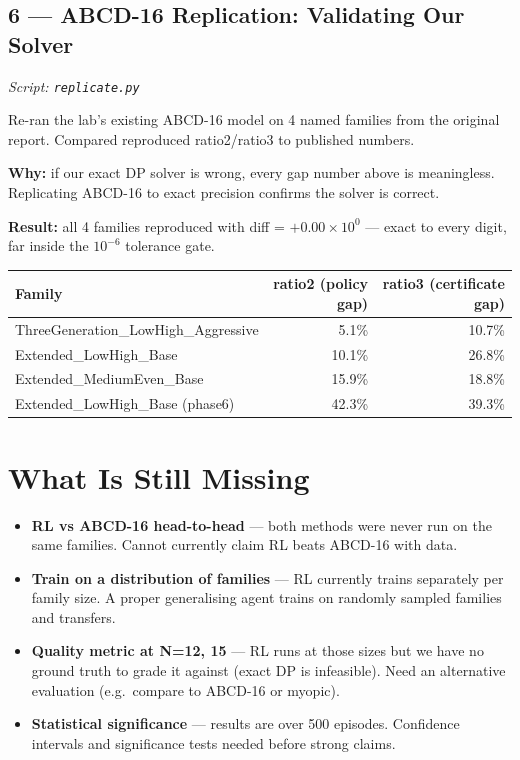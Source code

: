 \documentclass[11pt, a4paper]{article}
\begin{document}
\subsection{6 — ABCD-16 Replication: Validating Our Solver}
\textit{Script: \texttt{replicate.py}}

Re-ran the lab's existing ABCD-16 model on 4 named families from the original report.
Compared reproduced ratio2/ratio3 to published numbers.

\textbf{Why:} if our exact DP solver is wrong, every gap number above is meaningless.
Replicating ABCD-16 to exact precision confirms the solver is correct.

\textbf{Result:} all 4 families reproduced with diff = $+0.00 \times 10^{0}$ —
exact to every digit, far inside the $10^{-6}$ tolerance gate.

\begin{center}
\small
\begin{tabular}{lrr}
\toprule
\textbf{Family} & \textbf{ratio2 (policy gap)} & \textbf{ratio3 (certificate gap)} \\
\midrule
ThreeGeneration\_LowHigh\_Aggressive         & 5.1\%  & 10.7\% \\
Extended\_LowHigh\_Base                      & 10.1\% & 26.8\% \\
Extended\_MediumEven\_Base                   & 15.9\% & 18.8\% \\
Extended\_LowHigh\_Base (phase6)             & 42.3\% & 39.3\% \\
\bottomrule
\end{tabular}
\end{center}

\section{What Is Still Missing}

\begin{itemize}
  \item \textbf{RL vs ABCD-16 head-to-head} — both methods were never run on the
        same families. Cannot currently claim RL beats ABCD-16 with data.
  \item \textbf{Train on a distribution of families} — RL currently trains
        separately per family size. A proper generalising agent trains on randomly
        sampled families and transfers.
  \item \textbf{Quality metric at N=12, 15} — RL runs at those sizes but we have
        no ground truth to grade it against (exact DP is infeasible).
        Need an alternative evaluation (e.g.\ compare to ABCD-16 or myopic).
  \item \textbf{Statistical significance} — results are over 500 episodes.
        Confidence intervals and significance tests needed before strong claims.
\end{itemize}
\end{document}
